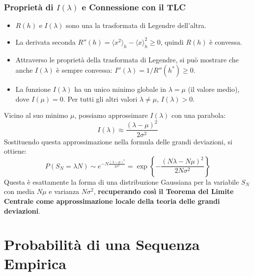 \subsubsection{Proprietà di $I(\lambda)$ e Connessione con il TLC}
\begin{itemize}
 \item $R(h)$ e $I(\lambda)$ sono una la trasformata di Legendre dell'altra.
 \item La derivata seconda $R''(h) = \langle x^2 \rangle_h - \langle x \rangle_h^2 \ge 0$, quindi $R(h)$ è convessa.
 \item Attraverso le proprietà della trasformata di Legendre, si può mostrare che anche $I(\lambda)$ è sempre convessa: $I''(\lambda) = 1/R''(h^*) \ge 0$.
 \item La funzione $I(\lambda)$ ha un unico minimo globale in $\lambda = \mu$ (il valore medio), dove $I(\mu)=0$. Per tutti gli altri valori $\lambda \neq \mu$, $I(\lambda)>0$.
\end{itemize}
Vicino al suo minimo $\mu$, possiamo approssimare $I(\lambda)$ con una parabola:
\begin{equation}
 I(\lambda) \approx \frac{(\lambda-\mu)^2}{2\sigma^2}
\end{equation}
Sostituendo questa approssimazione nella formula delle grandi deviazioni, si ottiene:
\begin{equation}
 P(S_N = \lambda N) \sim e^{-N\frac{(\lambda-\mu)^2}{2\sigma^2}} = \exp\left\{-\frac{(N\lambda-N\mu)^2}{2N\sigma^2}\right\}
\end{equation}
Questa è esattamente la forma di una distribuzione Gaussiana per la variabile $S_N$ con media $N\mu$ e varianza $N\sigma^2$, \textbf{recuperando così il Teorema del Limite Centrale come approssimazione locale della teoria delle grandi deviazioni}.

\newpage
\section{Probabilità di una Sequenza Empirica}

